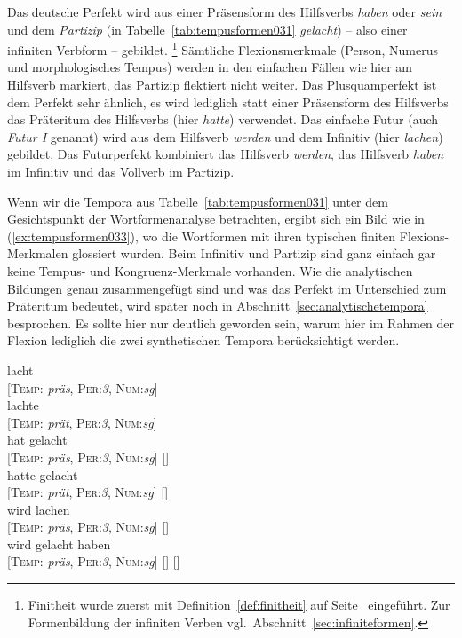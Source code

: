 Das deutsche Perfekt wird aus einer Präsensform des Hilfsverbs \textit{haben} oder \textit{sein} und dem \textit{Partizip} (in Tabelle~\ref{tab:tempusformen031} \textit{gelacht}) -- also einer infiniten Verbform -- gebildet.%
\footnote{Finitheit wurde zuerst mit Definition~\ref{def:finitheit} auf Seite~\pageref{def:finitheit} eingeführt.
Zur Formenbildung der infiniten Verben vgl.\ Abschnitt~\ref{sec:infiniteformen}.}
Sämtliche Flexionsmerkmale (Person, Numerus und morphologisches Tempus) werden in den einfachen Fällen wie hier am Hilfsverb markiert, das Partizip flektiert nicht weiter.
Das Plusquamperfekt ist dem Perfekt sehr ähnlich, es wird lediglich statt einer Präsensform des Hilfsverbs das Präteritum des Hilfsverbs (hier \textit{hatte}) verwendet.
Das einfache Futur (auch \textit{Futur I} genannt) wird aus dem Hilfsverb \textit{werden} und dem Infinitiv (hier \textit{lachen}) gebildet.
Das Futurperfekt kombiniert das Hilfsverb \textit{werden}, das Hilfsverb \textit{haben} im Infinitiv und das Vollverb im Partizip.

Wenn wir die Tempora aus Tabelle~\ref{tab:tempusformen031} unter dem Gesichtspunkt der Wortformenanalyse betrachten, ergibt sich ein Bild wie in (\ref{ex:tempusformen033}), wo die Wortformen mit ihren typischen finiten Flexions-Merkmalen glossiert wurden.
Beim Infinitiv und Partizip sind ganz einfach gar keine Tempus- und Kongruenz-Merkmale vorhanden.
Wie die analytischen Bildungen genau zusammengefügt sind und was \zB das Perfekt im Unterschied zum Präteritum bedeutet, wird später noch in Abschnitt~\ref{sec:analytischetempora} besprochen.
Es sollte hier nur deutlich geworden sein, warum hier im Rahmen der Flexion lediglich die zwei synthetischen Tempora berücksichtigt werden.

\begin{exe}
  \ex\label{ex:tempusformen033}
  \begin{xlist}
    \ex\gll lacht \\
    {[\textsc{Temp}: \textit{präs}, \textsc{Per}:\textit{3}, \textsc{Num}:\textit{sg}]}\\
    \ex\gll lachte \\
    {[\textsc{Temp}: \textit{prät}, \textsc{Per}:\textit{3}, \textsc{Num}:\textit{sg}]}\\
    \ex\gll hat gelacht\\
    {[\textsc{Temp}: \textit{präs}, \textsc{Per}:\textit{3}, \textsc{Num}:\textit{sg}]} {[]}\\
    \ex\gll hatte gelacht\\
    {[\textsc{Temp}: \textit{prät}, \textsc{Per}:\textit{3}, \textsc{Num}:\textit{sg}]} {[]}\\
    \ex\gll wird lachen\\
    {[\textsc{Temp}: \textit{präs}, \textsc{Per}:\textit{3}, \textsc{Num}:\textit{sg}]} {[]}\\
    \ex\gll wird gelacht haben \\
    {[\textsc{Temp}: \textit{präs}, \textsc{Per}:\textit{3}, \textsc{Num}:\textit{sg}]} {[]} {[]}\\
  \end{xlist}
\end{exe}

